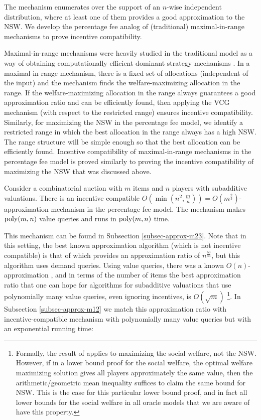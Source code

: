 \documentclass{theoretics}
\newcommand{\poly}{\hbox{poly}}
\begin{document}
The mechanism enumerates over the support of an $n$-wise independent distribution, where at least one of them provides a good approximation to the NSW. We develop the percentage fee analog of (traditional) maximal-in-range mechanisms to prove incentive compatibility.

Maximal-in-range mechanisms were heavily studied in the traditional model as a way of obtaining computationally efficient dominant strategy mechanisms \cite{DN07a,DN07b,BDFK10,DSS15}. In a maximal-in-range mechanism, there is a fixed set of allocations (independent of the input) and the mechanism finds the welfare-maximizing allocation in the range. If the welfare-maximizing allocation in the range always guarantees a good approximation ratio and can be efficiently found, then applying the VCG mechanism (with respect to the restricted range) ensures incentive compatibility. Similarly, for maximizing the NSW in the percentage fee model, we identify a restricted range in which the best allocation in the range always has a high NSW. The range structure will be simple enough so that the best allocation can be efficiently found. Incentive compatibility of maximal-in-range mechanisms in the percentage fee model is proved similarly to proving the incentive compatibility of maximizing the NSW that was discussed above.

\begin{theorem*}
Consider a combinatorial auction with $m$ items and $n$ players with subadditive valuations. There is an incentive compatible $O(\min(n^2,\frac m n))=O(m^{\frac 2 3})$-approximation mechanism in the percentage fee model. The mechanism makes $\poly(m,n)$ value queries and runs in $\poly(m,n)$ time.
\end{theorem*}

This mechanism can be found in Subsection \ref{subsec-approx-m23}. Note that in this setting, the best known approximation algorithm (which is not incentive compatible) is that of \cite{BKKN21} which provides an approximation ratio of $n^{\frac {53} {54}}$, but this algorithm uses demand queries. Using value queries, there was a known $O(n)$-approximation \cite{GKK20,BBKS20}, and in terms of the number of items the best approximation ratio that one can hope for algorithms for subadditive valuations that use polynomially many value queries, even ignoring incentives, is $O(\sqrt m)$ \cite{DNS05-journal}\footnote{Formally, the result of \cite{DNS05-journal} applies to maximizing the social welfare, not the NSW. However, if in a lower bound proof for the social welfare, the optimal welfare maximizing solution gives all players approximately the same value, then the arithmetic/geometric mean inequality suffices to claim the same bound for NSW. This is the case for this particular lower bound proof, and in fact all lower bounds for the social welfare in all oracle models that we are aware of have this property.}. In Subsection \ref{subsec-approx-m12} we match this approximation ratio with incentive-compatible mechanism with polynomially many value queries but with an exponential running time:
\end{document}
